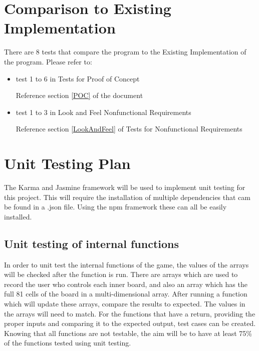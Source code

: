 \documentclass[12pt, titlepage]{article}
\begin{document}
\section{Comparison to Existing Implementation}
There are 8 tests that compare the program to the Existing Implementation of the program. Please refer to:
\begin{itemize}

\item test 1 to 6 in Tests for Proof of Concept

Reference section \ref{POC} of the document
\item test 1 to 3 in Look and Feel Nonfunctional Requirements

Reference section \ref{LookAndFeel} of Tests for Nonfunctional Requirements

\end{itemize}		
				
\section{Unit Testing Plan}
The Karma and Jasmine framework will be used to implement unit testing for this project. This will require the installation of multiple dependencies that cam be found in a .json file. Using the npm framework these can all be easily installed. 
\subsection{Unit testing of internal functions}
In order to unit test the internal functions of the game, the values of the arrays will be checked after the function is run. There are arrays which are used to record the user who controls each inner board, and also an array which has the full 81 cells of the board in a multi-dimensional array. After running a function which will update these arrays, compare the results to expected. The values in the arrays will need to match. For the functions that have a return, providing the proper inputs and comparing it to the expected output, test cases can be created. Knowing that all functions are not testable, the aim will be to have at least 75\% of the functions tested using unit testing.
\end{document}
